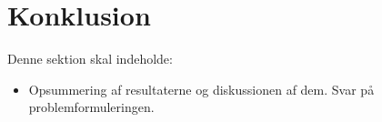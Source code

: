 \section{Konklusion}
Denne sektion skal indeholde:

\begin{itemize}
    \item Opsummering af resultaterne og diskussionen af dem. Svar på problemformuleringen. 
\end{itemize}{}